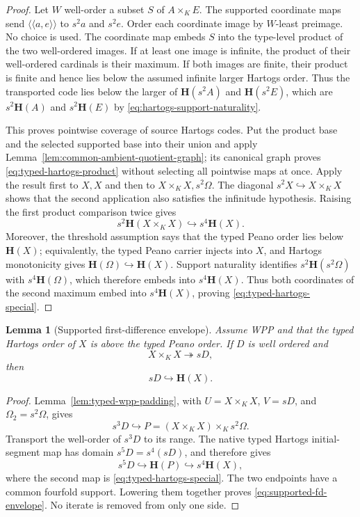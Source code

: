 \documentclass[11pt]{article}
\newtheorem{lemma}[theorem]{Lemma}
\numberwithin{equation}{section}
\theoremstyle{definition}
\theoremstyle{remark}
\newcommand{\inj}{\hookrightarrow}
\newcommand{\surj}{\twoheadrightarrow}
\begin{document}
\begin{proof}
Let $W$ well-order a subset $S$ of $A\times_KE$.  The supported coordinate
maps send $\langle\!\langle a,e\rangle\!\rangle$ to $s^2a$ and $s^2e$.
Order each coordinate image by $W$-least preimage.  No choice is used.
The coordinate map embeds $S$ into the type-level product of the two
well-ordered images.  If at least one image is infinite, the product of
their well-ordered cardinals is their maximum.  If both images are finite,
their product is finite and hence lies below the assumed infinite larger
Hartogs order.  Thus the transported code lies below the larger of
$\mathbf H(s^2A)$ and $\mathbf H(s^2E)$,
which are $s^2\mathbf H(A)$ and $s^2\mathbf H(E)$ by
\eqref{eq:hartogs-support-naturality}.

This proves pointwise coverage of source Hartogs codes.  Put the product
base and the selected supported base into their union and apply
Lemma~\ref{lem:common-ambient-quotient-graph}; its canonical graph proves
\eqref{eq:typed-hartogs-product} without selecting all pointwise maps at
once.  Apply the result first to $X,X$ and then to
$X\times_KX,s^2\Omega$.  The diagonal
$s^2X\inj X\times_KX$ shows that the second application also satisfies
the infinitude hypothesis.  Raising the first product comparison twice
gives
\[
 s^2\mathbf H(X\times_KX)\inj s^4\mathbf H(X).
\]
Moreover, the threshold assumption says that the typed Peano order lies
below $\mathbf H(X)$; equivalently, the typed Peano carrier injects into
$X$, and Hartogs monotonicity gives
$\mathbf H(\Omega)\inj\mathbf H(X)$.  Support naturality identifies
$s^2\mathbf H(s^2\Omega)$ with $s^4\mathbf H(\Omega)$, which therefore
embeds into $s^4\mathbf H(X)$.  Thus both coordinates of
the second maximum embed into $s^4\mathbf H(X)$, proving
\eqref{eq:typed-hartogs-special}.
\end{proof}

\begin{lemma}[Supported first-difference envelope]
\label{lem:supported-first-difference-envelope}
Assume WPP and that the typed Hartogs order of $X$ is above the typed
Peano order.  If $D$ is well ordered and
\[
 X\times_KX\surj sD,
\]
then
\begin{equation}
 sD\inj\mathbf H(X).
 \label{eq:supported-fd-envelope}
\end{equation}
\end{lemma}

\begin{proof}
Lemma~\ref{lem:typed-wpp-padding}, with
$U=X\times_KX$, $V=sD$, and $\Omega_2=s^2\Omega$, gives
\[
 s^3D\inj P=(X\times_KX)\times_Ks^2\Omega.
\]
Transport the well-order of $s^3D$ to its range.  The native typed
Hartogs initial-segment map has domain $s^5D=s^4(sD)$, and therefore gives
\[
 s^5D\inj\mathbf H(P)\inj s^4\mathbf H(X),
\]
where the second map is \eqref{eq:typed-hartogs-special}.  The two
endpoints have a common fourfold support.  Lowering them together proves
\eqref{eq:supported-fd-envelope}.  No iterate is removed from only one
side.
\end{proof}
\end{document}
